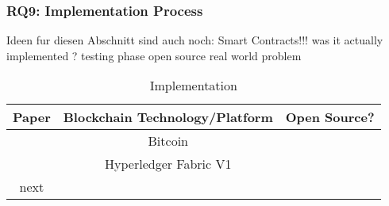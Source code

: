 \clearpage
\subsubsection{RQ9: Implementation Process}
Ideen fur diesen Abschnitt sind auch noch:
Smart Contracts!!! 
was it actually implemented ? 
testing phase
open source
real world problem


\begin{longtable}{ |c|c|c| }
	\caption{Implementation}
	\label{tab:rq9_implementation_process}\\
	\hline
 	\textbf{Paper} & Blockchain Technology/Platform & \textbf{Open Source?} \\ [0.5ex] 
 	\hline\hline
 	\endhead
 	\cite{2017_Gipp} & Bitcoin & \cmark \\
	\hline
	\cite{2017_Tackmann} & Hyperledger Fabric V1 & \xmark \\
	next & \xmark \\
	\hline
\end{longtable}